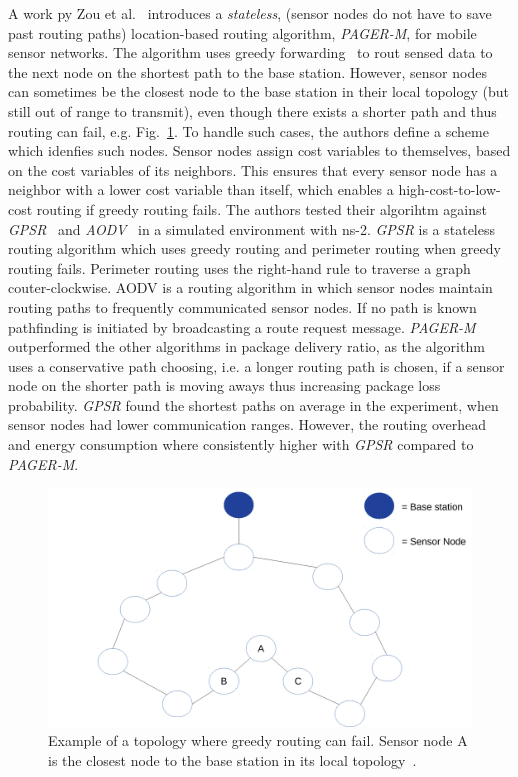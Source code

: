 A work py Zou et al.~\cite{zou2004pager} introduces a \textit{stateless},
(sensor nodes do not have to save past routing paths) location-based routing
algorithm, \textit{PAGER-M}, for mobile sensor networks. The algorithm uses
greedy forwarding~\cite{stojmenovic2001loop} to rout sensed data to the next
node on the shortest path to the base station. However, sensor nodes can
sometimes be the closest node to the base station in their local topology (but
still out of range to transmit), even though there exists a shorter path and
thus routing can fail, e.g. Fig.~\ref{fig:shadow nodes}. To handle such cases,
the authors define a scheme which idenfies such nodes. Sensor nodes assign cost
variables to themselves, based on the cost variables of its neighbors. This
ensures that every sensor node has a neighbor with a lower cost variable than
itself, which enables a high-cost-to-low-cost routing if greedy routing fails.
The authors tested their algorihtm against \textit{GPSR}~\cite{karp2000gpsr}
and \textit{AODV}~\cite{perkins2003ad} in a simulated environment with ns-2.
\textit{GPSR} is a stateless routing algorithm which uses greedy routing and
perimeter routing when greedy routing fails. Perimeter routing uses the
right-hand rule to traverse a graph couter-clockwise. AODV is a routing
algorithm in which sensor nodes maintain routing paths to frequently
communicated sensor nodes. If no path is known pathfinding is initiated by
broadcasting a route request message. \textit{PAGER-M} outperformed the other
algorithms in package delivery ratio, as the algorithm uses a conservative path
choosing, i.e. a longer routing path is chosen, if a sensor node on the shorter
path is moving aways thus increasing package loss probability. \textit{GPSR}
found the shortest paths on average in the experiment, when sensor nodes had
lower communication ranges. However, the routing overhead and energy
consumption where consistently higher with \textit{GPSR} compared to
\textit{PAGER-M}.

\begin{figure}[h]
\includegraphics[width=\linewidth]{images/pager-shadow-nodes.pdf}
\caption{Example of a topology where greedy routing can fail. Sensor node A is
the closest node to the base station in its local topology~\cite{zou2004pager}.}
\label{fig:shadow nodes}
\centering
\end{figure}

